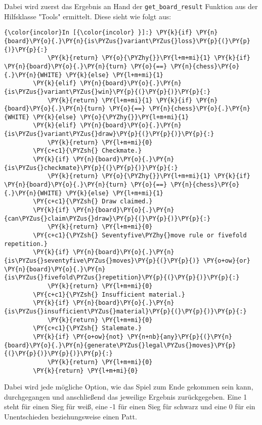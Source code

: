     Dabei wird zuerst das Ergebnis an Hand der \texttt{get\_board\_result}
Funktion aus der Hilfsklasse "Tools" ermittelt. Diese sieht wie folgt
aus:

    \begin{Verbatim}[commandchars=\\\{\}]
{\color{incolor}In [{\color{incolor} }]:} \PY{k}{if} \PY{n}{board}\PY{o}{.}\PY{n}{is\PYZus{}variant\PYZus{}loss}\PY{p}{(}\PY{p}{)}\PY{p}{:}
            \PY{k}{return} \PY{o}{\PYZhy{}}\PY{l+m+mi}{1} \PY{k}{if} \PY{n}{board}\PY{o}{.}\PY{n}{turn} \PY{o}{==} \PY{n}{chess}\PY{o}{.}\PY{n}{WHITE} \PY{k}{else} \PY{l+m+mi}{1}
        \PY{k}{elif} \PY{n}{board}\PY{o}{.}\PY{n}{is\PYZus{}variant\PYZus{}win}\PY{p}{(}\PY{p}{)}\PY{p}{:}
            \PY{k}{return} \PY{l+m+mi}{1} \PY{k}{if} \PY{n}{board}\PY{o}{.}\PY{n}{turn} \PY{o}{==} \PY{n}{chess}\PY{o}{.}\PY{n}{WHITE} \PY{k}{else} \PY{o}{\PYZhy{}}\PY{l+m+mi}{1}
        \PY{k}{elif} \PY{n}{board}\PY{o}{.}\PY{n}{is\PYZus{}variant\PYZus{}draw}\PY{p}{(}\PY{p}{)}\PY{p}{:}
            \PY{k}{return} \PY{l+m+mi}{0}
        \PY{c+c1}{\PYZsh{} Checkmate.}
        \PY{k}{if} \PY{n}{board}\PY{o}{.}\PY{n}{is\PYZus{}checkmate}\PY{p}{(}\PY{p}{)}\PY{p}{:}
            \PY{k}{return} \PY{o}{\PYZhy{}}\PY{l+m+mi}{1} \PY{k}{if} \PY{n}{board}\PY{o}{.}\PY{n}{turn} \PY{o}{==} \PY{n}{chess}\PY{o}{.}\PY{n}{WHITE} \PY{k}{else} \PY{l+m+mi}{1}
        \PY{c+c1}{\PYZsh{} Draw claimed.}
        \PY{k}{if} \PY{n}{board}\PY{o}{.}\PY{n}{can\PYZus{}claim\PYZus{}draw}\PY{p}{(}\PY{p}{)}\PY{p}{:}
            \PY{k}{return} \PY{l+m+mi}{0}
        \PY{c+c1}{\PYZsh{} Seventyfive\PYZhy{}move rule or fivefold repetition.}
        \PY{k}{if} \PY{n}{board}\PY{o}{.}\PY{n}{is\PYZus{}seventyfive\PYZus{}moves}\PY{p}{(}\PY{p}{)} \PY{o+ow}{or} \PY{n}{board}\PY{o}{.}\PY{n}{is\PYZus{}fivefold\PYZus{}repetition}\PY{p}{(}\PY{p}{)}\PY{p}{:}
            \PY{k}{return} \PY{l+m+mi}{0}
        \PY{c+c1}{\PYZsh{} Insufficient material.}
        \PY{k}{if} \PY{n}{board}\PY{o}{.}\PY{n}{is\PYZus{}insufficient\PYZus{}material}\PY{p}{(}\PY{p}{)}\PY{p}{:}
            \PY{k}{return} \PY{l+m+mi}{0}
        \PY{c+c1}{\PYZsh{} Stalemate.}
        \PY{k}{if} \PY{o+ow}{not} \PY{n+nb}{any}\PY{p}{(}\PY{n}{board}\PY{o}{.}\PY{n}{generate\PYZus{}legal\PYZus{}moves}\PY{p}{(}\PY{p}{)}\PY{p}{)}\PY{p}{:}
            \PY{k}{return} \PY{l+m+mi}{0}
        \PY{k}{return} \PY{l+m+mi}{0}
\end{Verbatim}

    Dabei wird jede mögliche Option, wie das Spiel zum Ende gekommen sein
kann, durchgegangen und anschließend das jeweilige Ergebnis
zurückgegeben. Eine 1 steht für einen Sieg für weiß, eine -1 für einen
Sieg für schwarz und eine 0 für ein Unentschieden beziehungsweise einen
Patt.

